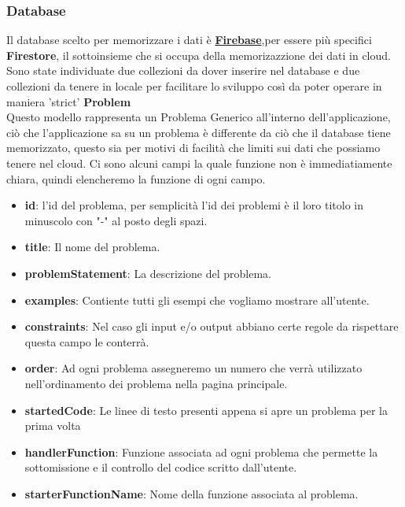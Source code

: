 \documentclass[11pt, a4paper]{article}
\theoremstyle{definition}
\begin{document}
\subsubsection{Database}
Il database scelto per memorizzare i dati è \href{https://firebase.google.com}{\textbf{Firebase}},per essere più specifici \textbf{Firestore}, il sottoinsieme che si occupa della memorizazzione dei dati in cloud.
Sono state individuate due collezioni da dover inserire nel database e due collezioni da tenere in locale per facilitare lo sviluppo così da poter operare in maniera 'strict'
\newpage
\textbullet   \textbf{ Problem}\\
Questo modello rappresenta un Problema Generico all'interno dell'applicazione, ciò che l'applicazione sa su un problema è differente da ciò che il database tiene memorizzato, questo sia per motivi di facilità che limiti sui dati che possiamo tenere nel cloud.
Ci sono alcuni campi la quale funzione non è immediatiamente chiara, quindi elencheremo la funzione di ogni campo.
\begin{itemize}
  \item \textbf{id}: l'id del problema, per semplicità l'id dei problemi è il loro titolo in minuscolo con "-" al posto degli spazi.
  \item \textbf{title}: Il nome del problema.
  \item \textbf{problemStatement}: La descrizione del problema.
  \item \textbf{examples}: Contiente tutti gli esempi che vogliamo mostrare all'utente.
  \item \textbf{constraints}: Nel caso gli input e/o output abbiano certe regole da rispettare questa campo le conterrà.
  \item \textbf{order}: Ad ogni problema assegneremo un numero che verrà utilizzato nell'ordinamento dei problema nella pagina principale.
  \item \textbf{startedCode}: Le linee di testo presenti appena si apre un problema per la prima volta
  \item \textbf{handlerFunction}: Funzione associata ad ogni problema che permette la sottomissione e il controllo del codice scritto dall'utente.
  \item \textbf{starterFunctionName}: Nome della funzione associata al problema.
\end{itemize}
\end{document}

